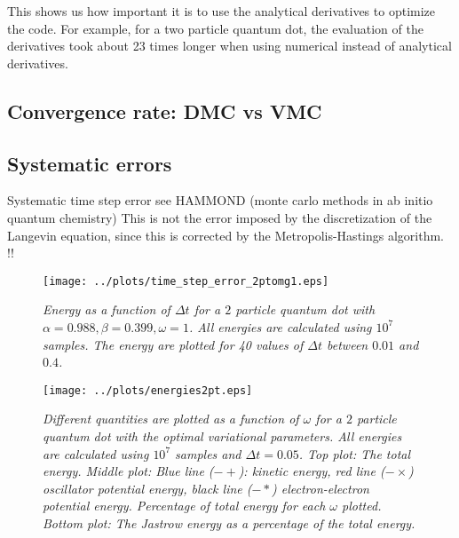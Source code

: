 \documentclass[a4paper,10pt,twocolumn]{article} %
\begin{document}
This shows us how important it is to use the analytical derivatives to optimize the code. 
For example, for a two particle quantum dot, the evaluation of the derivatives took about 23 times longer when using numerical instead of analytical derivatives.

\subsection{Convergence rate: DMC vs VMC}



\subsection{Systematic errors}

Systematic time step error see HAMMOND \cite{hammond} (monte carlo methods in ab initio quantum chemistry)
This is not the error imposed by the discretization of the Langevin equation, since this is corrected by the Metropolis-Hastings algorithm. !!

\begin{figure}[h!]
\begin{center}
\caption{{\it%
			Energy as a function of $\Delta t$ for a $2$ particle quantum dot with $\alpha=0.988,\beta=0.399,\omega=1$. All energies are calculated using $10^7$ samples.
			The energy are plotted for 40 values of $\Delta t$ between $0.01$ and $0.4$. 
		}}
		\label{fig:ef}
	\texttt{[image: ../plots/time\_step\_error\_2ptomg1.eps]}
\end{center}
\end{figure}

\begin{figure}[h!]
\begin{center}
\caption{{\it%
			Different quantities are plotted as a function of $\omega$ for a $2$ particle quantum dot with the optimal variational parameters. 
			All energies are calculated using $10^7$ samples and $\Delta t = 0.05$.
			Top plot: The total energy.
			Middle plot:
			Blue line ($-+$): kinetic energy, red line ($-\times$) oscillator potential energy, black line ($-*$) electron-electron potential energy.
			Percentage of total energy for each $\omega$ plotted.
			Bottom plot: The Jastrow energy as a percentage of the total energy. 
		}}
		\label{figes}
	\texttt{[image: ../plots/energies2pt.eps]}
\end{center}
\end{figure}
\end{document}
